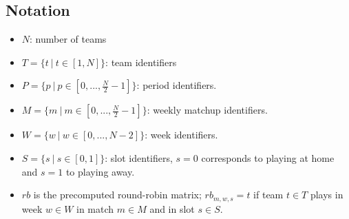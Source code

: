 \documentclass{article}
\begin{document}
\subsection{Notation}
\begin{itemize}
  \item $N$: number of teams
  \item $T=\{t\ |\ t \in [1, N]\}$: team identifiers
  \item $P=\{p\ |\ p \in [0, ..., \frac{N}{2} - 1]\}$: period identifiers.
  \item $M=\{m\ |\ m \in [0, ..., \frac{N}{2} - 1]\}$: weekly matchup identifiers.
  \item $W=\{w\ |\ w \in [0, ..., N-2]\}$: week identifiers.
  \item $S=\{s\ |\ s \in [0,1]\}$: slot identifiers, $s=0$ corresponds to playing at home and $s=1$ to playing away.
  \item $rb$ is the precomputed round-robin matrix; $rb_{m, w, s}=t$ if team $t \in T$ plays in week $w \in W$ in match $m \in M$ and in slot $s \in S$.
  
\end{itemize}













\end{document}
